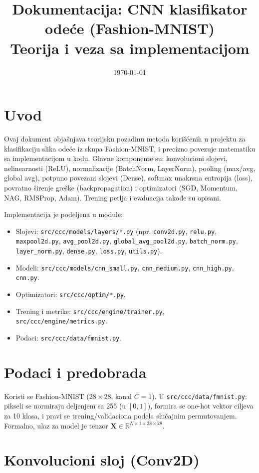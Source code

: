 \documentclass[11pt,a4paper]{article}
\title{Dokumentacija: CNN klasifikator odeće (Fashion-MNIST)\vspace{4pt}\\\large Teorija i veza sa implementacijom}
\author{}
\date{\today}
\begin{document}
\maketitle

\tableofcontents

\section{Uvod}
Ovaj dokument objašnjava teorijsku pozadinu metoda korišćenih u projektu za klasifikaciju slika odeće iz skupa Fashion-MNIST, i precizno povezuje matematiku sa implementacijom u kodu. Glavne komponente su: konvolucioni slojevi, nelinearnosti (ReLU), normalizacije (BatchNorm, LayerNorm), pooling (max/avg, global avg), potpuno povezani slojevi (Dense), softmax unakrsna entropija (loss), povratno širenje greške (backpropagation) i optimizatori (SGD, Momentum, NAG, RMSProp, Adam). Trening petlja i evaluacija takođe su opisani.

Implementacija je podeljena u module:
\begin{itemize}
  \item Slojevi: \texttt{src/ccc/models/layers/*.py} (npr. \texttt{conv2d.py}, \texttt{relu.py}, \texttt{maxpool2d.py}, \texttt{avg\_pool2d.py}, \texttt{global\_avg\_pool2d.py}, \texttt{batch\_norm.py}, \texttt{layer\_norm.py}, \texttt{dense.py}, \texttt{loss.py}, \texttt{utils.py}).
  \item Modeli: \texttt{src/ccc/models/cnn\_small.py}, \texttt{cnn\_medium.py}, \texttt{cnn\_high.py}, \texttt{cnn.py}.
  \item Optimizatori: \texttt{src/ccc/optim/*.py}.
  \item Trening i metrike: \texttt{src/ccc/engine/trainer.py}, \texttt{src/ccc/engine/metrics.py}.
  \item Podaci: \texttt{src/ccc/data/fmnist.py}.
\end{itemize}

\section{Podaci i predobrada}
Koristi se Fashion-MNIST (28\,$\times$\,28, kanal $C{=}1$). U \texttt{src/ccc/data/fmnist.py}: pikseli se normiraju deljenjem sa 255 (u $[0,1]$), formira se one-hot vektor ciljeva za 10 klasa, i pravi se trening/validaciona podela slučajnim permutovanjem. Formalno, ulaz za model je tenzor $\mathbf{X} \in \mathbb{R}^{N\times 1\times 28\times 28}$.

\section{Konvolucioni sloj (Conv2D)}
\end{document}
